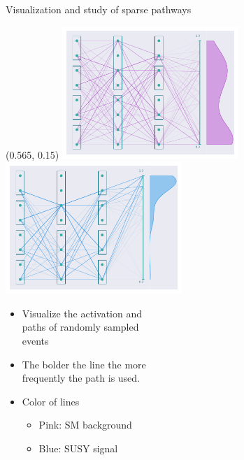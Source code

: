 \documentclass[UKenglish]{beamer}
\begin{document}
\begin{frame}[noframenumbering]{Visualization and study of sparse pathways}
    \begin{textblock}{0.8}(0.565, 0.15)
        \includegraphics[width = 0.5\textwidth]{figures/NetworkVis/AfterTrainingBkg.pdf}
        \includegraphics[width = 0.5\textwidth]{figures/NetworkVis/AfterTrainingSig.pdf}
    \end{textblock}
    \begin{itemize}
        \item Visualize the activation and \\
        paths of randomly sampled \\
        events
        \item The bolder the line the more\\ 
        frequently the path is used.
        \item Color of lines 
        \begin{itemize}
            \item Pink: SM background
            \item Blue: SUSY signal
        \end{itemize}
    \end{itemize}
\end{frame}
\end{document}

